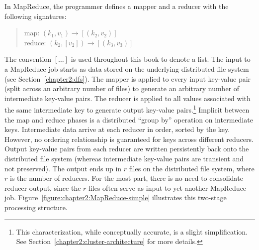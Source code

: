 \documentclass[11pt]{article}
\newcommand{\todo}[1]{}
\begin{document}
In MapReduce, the programmer defines a mapper and a reducer with the
following signatures:

\begin{quote}
map: $(k_1, v_1) \rightarrow [(k_2, v_2)]$ \\
reduce: $(k_2, [v_2]) \rightarrow [(k_3, v_3)]$
\end{quote}

\noindent The convention $[\ldots]$ is used
throughout this book to denote a list.  The input to a MapReduce job
starts as data stored on the underlying distributed file system (see
Section~\ref{chapter2:dfs}).  The mapper is applied to every input
key-value pair (split across an arbitrary number of files) to generate
an arbitrary number of intermediate key-value pairs.  The reducer is
applied to all values associated with the same intermediate key to
generate output key-value pairs.\footnote{This characterization, while
conceptually accurate, is a slight simplification.  See
Section~\ref{chapter2:cluster-architecture} for more details.}
Implicit between the map and reduce phases is a distributed ``group
by'' operation on intermediate keys.  Intermediate data arrive at each
reducer in order, sorted by the key.  However, no ordering
relationship is guaranteed for keys across different reducers.  Output
key-value pairs from each reducer are written persistently back onto
the distributed file system (whereas intermediate key-value pairs are
transient and not preserved).  The output ends up in $r$ files on the
distributed file system, where $r$ is the number of reducers.  For the
most part, there is no need to consolidate reducer output, since the
$r$ files often serve as input to yet another MapReduce job.
Figure~\ref{figure:chapter2:MapReduce-simple} illustrates this
two-stage processing structure.
\todo{Rename ``Shuffle and Sort'' to ``Distributed Group By''.}
\end{document}
